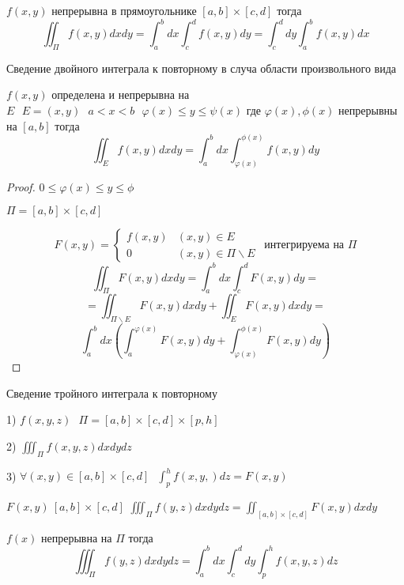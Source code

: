 \begin{block}[Следствие]
  $f(x,y)$ непрерывна в прямоугольнике $[a,b] \times [c,d]$ тогда
  $$
  \iint_{\Pi} f(x,y) dxdy = \int_a^b dx \int_c^d f(x,y) dy =
  \int_c^d dy \int_a^b f(x,y) dx
  $$
\end{block}

\begin{title}[\Large]
  Сведение двойного интеграла к повторному в случа области произвольного вида
\end{title}

\begin{theorem}
  $f(x,y)$ определена и непрерывна на $E ~~~ E = (x,y) ~~~ a < x < b ~~~
  \varphi(x) \le y \le \psi(x)$ где $\varphi(x), \phi(x)$ непрерывны на
  $[a,b]$ тогда
  $$
  \iint_E f(x,y)dxdy = \int_a^b dx \int_{\varphi(x)}^{\phi(x)} f(x,y)dy
  $$
\end{theorem}

\begin{proof}
  $0 \le \varphi(x) \le y \le \phi$

  $\Pi = [a,b] \times [c,d]$

  $$
  F(x,y) =
  \left\{
  \begin{array}{cc}
    f(x,y) &(x,y) \in E \\
    0 & (x,y) \in \Pi \backslash E
  \end{array}
  \right. ~~ \text{интегрируема на $\Pi$}
  $$
  $$
  \iint_{\Pi} F(x,y) dxdy = \int_a^b dx \int_c^d F(x,y) dy =
  $$
  $$
  = \iint_{\Pi \backslash E} F(x,y) dxdy + \iint_E F(x,y)dxdy =
  $$
  $$
  \int_a^b dx \left( \int_a^{\varphi(x)} F(x, y) dy +
  \int_{\varphi(x)}^{\phi(x)} F(x, y) dy \right)
  $$
\end{proof}

\begin{title}[\Large]
  Сведение тройного интеграла к повторному
\end{title}

\begin{theorem}
  1) $f(x,y,z) ~~~ \Pi = [a,b] \times [c,d] \times [p,h]$

  2) $\iiint_{\Pi} f(x,y,z) dx dy dz$

  3) $\forall (x,y) \in [a,b] \times [c,d] ~~~ \int_p^h f(x,y,)dz = F(x,y)$

  $F(x,y) ~ [a,b] \times [c,d]$
  $\iiint_{\Pi} f(y,z) dxdydz = \iint_{[a,b] \times [c,d]} F(x,y) dxdy$

  $f(x)$ непрерывна на $\Pi$ тогда
  $$
  \iiint_{\Pi} f(y,z) dxdydz = \int_a^b dx \int_c^d dy \int_p^h f(x,y,z) dz
  $$
\end{theorem}
